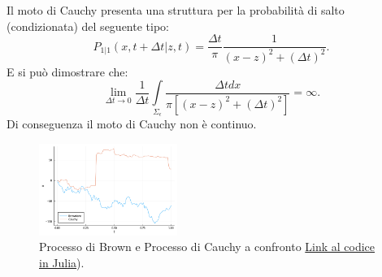 \noindent
\begin{exmp}
    Il moto di Cauchy presenta una struttura per la probabilità di salto (condizionata) del seguente tipo:
    \[
	P_{1|1}(x,t+\Delta t| z , t)  = \frac{\Delta t}{\pi} \frac{1}{\left(x-z\right)^2 + \left(\Delta t\right)^2}
    .\] 
    E si può dimostrare che:
    \[
	\lim_{\Delta t \to 0} \frac{1}{\Delta t}\int\limits_{\Sigma_\epsilon}
	\frac{\Delta t dx}{\pi\left[\left(x-z\right)^2 + \left(\Delta t\right)^2\right]} = \infty
    .\] 
    Di conseguenza il moto di Cauchy non è continuo.
\end{exmp}
\noindent
\begin{figure}[H]
    \centering
    \includegraphics[width=0.4\textwidth]{figures/4_cauchy-brown.png}
    \caption{\scriptsize Processo di Brown e Processo di Cauchy a confronto \href{https://github.com/dodogabrie/Sistemi-Complessi/blob/master/python-project/lezione4/lez4_Cauchy-Brown.ipynb}{Link al codice in Julia}).}
    \label{fig:-fig}
\end{figure}


